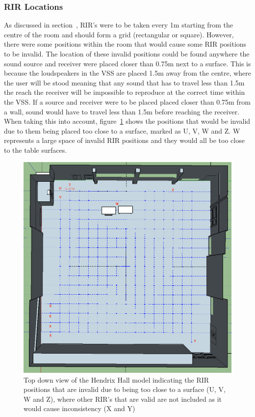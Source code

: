 \documentclass[../../main.tex]{subfiles}
\begin{document}
		\subsubsection{RIR Locations}
			As discussed in section~, \ac{RIR}'s were to be taken every 1m starting from the centre of the room and should form a grid (rectangular or square). However, there were some positions within the room that would cause some \ac{RIR} positions to be invalid. The location of these invalid positions could be found anywhere the sound source and receiver were placed closer than 0.75m next to a surface. This is because the loudspeakers in the \ac{VSS} are placed 1.5m away from the centre, where the user will be stood meaning that any sound that has to travel less than 1.5m the reach the receiver will be impossible to reproduce at the correct time within the \ac{VSS}. If a source and receiver were to be placed placed closer than 0.75m from a wall, sound would have to travel less than 1.5m before reaching the receiver. When taking this into account, figure~\ref{incorrectRIRPositions} shows the positions that would be invalid due to them being placed too close to a surface, marked as U, V, W and Z. W represents a large space of invalid \ac{RIR} positions and they would all be too close to the table surfaces.

			\begin{figure}[H]
				\centerline{\includegraphics[scale = 0.4]{Sections/Implementation/Odeon/images/RIRPositions/RIRPositionAnnotated.png}}
				\caption{Top down view of the Hendrix Hall model indicating the \ac{RIR} positions that are invalid due to being too close to a surface (U, V, W and Z), where other \ac{RIR}'s that are valid are not included as it would cause inconsistency (X and Y)}
				\label{incorrectRIRPositions}
			\end{figure}
\end{document}
